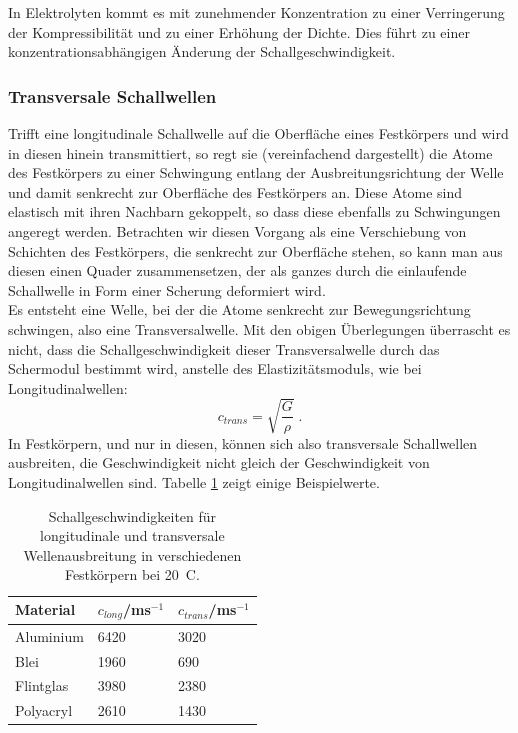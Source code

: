 In Elektrolyten kommt es mit zunehmender Konzentration zu einer Verringerung der Kompressibilität und zu einer Erhöhung der Dichte. Dies führt zu einer konzentrationsabhängigen Änderung der Schallgeschwindigkeit.

\subsubsection{Transversale Schallwellen}

Trifft eine longitudinale Schallwelle auf die Oberfläche eines Festkörpers und wird in diesen hinein transmittiert, so regt sie (vereinfachend dargestellt) die Atome des Festkörpers zu einer Schwingung entlang der Ausbreitungsrichtung der Welle und damit senkrecht zur Oberfläche des Festkörpers an. Diese Atome sind elastisch mit ihren Nachbarn gekoppelt, so dass diese ebenfalls zu Schwingungen angeregt werden. Betrachten wir diesen Vorgang als eine Verschiebung von Schichten des Festkörpers, die senkrecht zur Oberfläche stehen, so kann man aus diesen einen Quader zusammensetzen, der als ganzes durch die einlaufende Schallwelle in Form einer Scherung deformiert wird. \\
Es entsteht eine Welle, bei der die Atome senkrecht zur Bewegungsrichtung schwingen, also eine Transversalwelle. Mit den obigen Überlegungen überrascht es nicht, dass die Schallgeschwindigkeit dieser Transversalwelle durch das Schermodul bestimmt wird, anstelle des Elastizitätsmoduls, wie bei Longitudinalwellen:
\begin{equation}
	c_{trans} = \sqrt{\frac{G}{\rho}}\; .
\end{equation}
In Festkörpern, und nur in diesen, können sich also transversale Schallwellen ausbreiten, die Geschwindigkeit nicht gleich der Geschwindigkeit von Longitudinalwellen sind. Tabelle \ref{tab:Schallgeschwindigkeiten} zeigt einige Beispielwerte.

\begin{table}[hb]
	\centering
		\begin{tabular}{l|l|l}
			Material & $c_{long}$/ms$^{-1}$ & $c_{trans}$/ms$^{-1}$ \\
			\hline
			Aluminium & 6420 & 3020\\
			Blei & 1960 & 690\\
			Flintglas & 3980 & 2380\\
			Polyacryl & 2610 & 1430\\
		\end{tabular}
	\caption{Schallgeschwindigkeiten für longitudinale und transversale Wellenausbreitung in verschiedenen Festkörpern bei 20\degree~C.}
	\label{tab:Schallgeschwindigkeiten}
\end{table}

